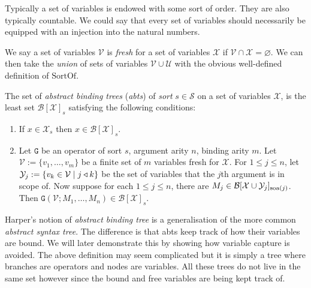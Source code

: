 \begin{remark}\label{var_order}
    Typically a set of variables is endowed with some sort of order. They are also typically countable. We could say that every set of variables should necessarily be equipped with an injection into the natural numbers.
\end{remark}

\begin{defin}
    We say a set of variables $\mathcal{V}$ is \emph{fresh} for a set of variables $\mathcal{X}$ if $\mathcal{V} \cap \mathcal{X} = \varnothing$. We can then take the \emph{union} of sets of variables $\mathcal{V} \cup \mathcal{U}$ with the obvious well-defined definition of $\mathrm{SortOf}$.
\end{defin}

\begin{defin}\label{abt}
    The set of \emph{abstract binding trees} (\emph{abts}) of \emph{sort} $s\in \mathcal{S}$ on a set of variables $\mathcal{X}$, is the least set $\mathcal{B}[\mathcal{X}]_s$ satisfying the following conditions:
    \begin{enumerate}
        \item If $x \in \mathcal{X}_s$ then $x \in \mathcal{B}[\mathcal{X}]_s$.
        \item Let $\mathtt{G}$ be an operator of sort $s$, argument arity $n$, binding arity $m$. Let $\mathcal{V} := \{v_1, \dots , v_m \}$ be a finite set of $m$ variables fresh for $\mathcal{X}$. For $1 \le j \le n$, let $\mathcal{Y}_j := \{ v_k \in \mathcal{V} \mid j \triangleleft k\}$ be the set of variables that the $j$th argument is in scope of. Now suppose for each $1 \le j \le n$, there are $M_j \in \mathcal{B}[\mathcal{X} \cup \mathcal{Y}_j]_{\text{soa}(j)}$. Then $\mathtt{G}(\mathcal{V}; M_1, \dots, M_n) \in \mathcal{B}[\mathcal{X}]_s$.
    \end{enumerate}
    
\end{defin}

\begin{remark}
    Harper's notion of \emph{abstract binding tree} is a generalisation of the more common \emph{abstract syntax tree}. The difference is that abts keep track of how their variables are bound. We will later demonstrate this by showing how variable capture is avoided. The above definition may seem complicated but it is simply a tree where branches are operators and nodes are variables. All these trees do not live in the same set however since the bound and free variables are being kept track of.
\end{remark}

